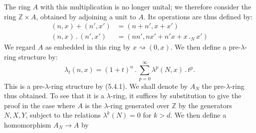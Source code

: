 The ring \(A\) with this multiplication is no longer unital; we therefore consider the ring \(\mathbb Z\times A\), obtained by adjoining a unit to \(A\). Its operations are thus defined by:
\begin{equation}\tag{5.5.2}
\begin{aligned}
  (n,x)+(n',x')&=(n+n',x+x')\\
  (n,x)\mathbin{.}(n',x')&=(nn',nx'+n'x+x\mathbin{.}_N x')
\end{aligned}
\end{equation}
We regard \(A\) as embedded in this ring by \(x\rightsquigarrow(0,x)\). We then define a pre-\(\lambda\)-ring structure by:
\begin{equation}\tag{5.5.3}
  \lambda_t(n,x)=(1+t)^n\mathbin{.}\sum_{p=0}^{\infty}\lambda^p(N,x)\mathbin{.} t^p.
\end{equation}
This is a pre-\(\lambda\)-ring structure by (5.4.1). We shall denote by \(A_N\) the pre-\(\lambda\)-ring thus obtained. To see that it is a \(\lambda\)-ring, it suffices by substitution to give the proof in the case where \(A\) is the \(\lambda\)-ring generated over \(\mathbb Z\) by the generators \(N,X,Y\), subject to the relations \(\lambda^k(N)=0\) for \(k>d\). We then define a homomorphism \(A_N\to A\) by
